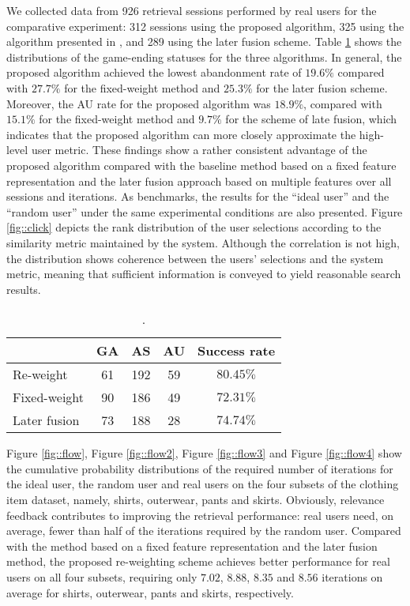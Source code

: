 \documentclass[journal]{IEEEtran}
\begin{document}
We collected data from 926 retrieval sessions performed by real users for the comparative experiment: 312 sessions using the proposed algorithm, 325 using the algorithm presented in \cite{fang2005experiments}, and 289 using the later fusion scheme. Table \ref{tab::rate} shows the distributions of the game-ending statuses for the three algorithms. In general, the proposed algorithm achieved the lowest abandonment rate of $19.6\%$ compared with $27.7\%$ for the fixed-weight method and $25.3\%$ for the later fusion scheme. Moreover, the AU rate for the proposed algorithm was $18.9\%$, compared with $15.1\%$ for the fixed-weight method and $9.7\%$ for the scheme of late fusion, which indicates that the proposed algorithm can more closely approximate the high-level user metric. %
These findings show a rather consistent advantage of the proposed algorithm compared with the baseline method based on a fixed feature representation and the later fusion approach based on multiple features over all sessions and iterations. As benchmarks, the results for the “ideal user” and the “random user” under the same experimental conditions are also presented. Figure \ref{fig::click} depicts the rank distribution of the user selections according to the similarity metric maintained by the system. Although the correlation is not high, the distribution shows coherence between the users' selections and the system metric, meaning that sufficient information is conveyed to yield reasonable search results.

\begin{table}[t]
\caption{.}
\label{tab::rate}
\small
\centering
\vspace{+1ex}
\begin{tabular}{|l|c|c|c|c|}
\hline
  & GA & AS & AU & Success rate\\
\hline
Re-weight & 61 & 192 & 59 & $80.45\%$ \\
\hline
Fixed-weight & 90 & 186 & 49 & $72.31\%$ \\
\hline
Later fusion & 73 & 188 & 28 & $74.74\%$ \\
\hline
\end{tabular}
\end{table}

Figure \ref{fig::flow}, Figure \ref{fig::flow2}, Figure \ref{fig::flow3} and Figure \ref{fig::flow4} show the cumulative probability distributions of the required number of iterations for the ideal user, the random user and real users on the four subsets of the clothing item dataset, namely, shirts, outerwear, pants and skirts. Obviously, relevance feedback contributes to improving the retrieval performance: real users need, on average, fewer than half of the iterations required by the random user. Compared with the method based on a fixed feature representation and the later fusion method, the proposed re-weighting scheme achieves better performance for real users on all four subsets, requiring only $7.02$, $8.88$, $8.35$ and $8.56$ iterations on average for shirts, outerwear, pants and skirts, respectively.
\end{document}

